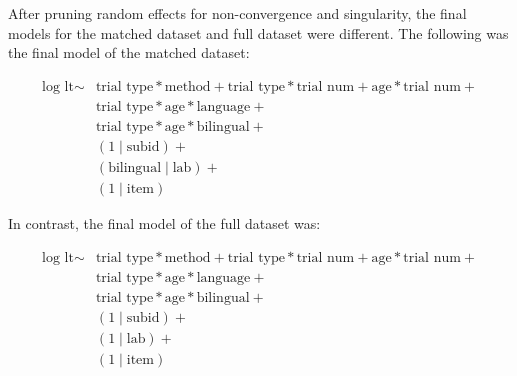 \documentclass[,man,floatsintext]{apa6}
\begin{document}
After pruning random effects for non-convergence and singularity, the final models for the matched dataset and full dataset were different. The following was the final model of the matched dataset:

\begin{equation}
\begin{split}
\text{log lt} \sim & \text{trial type} * \text{method} + \text{trial type} * \text{trial num} + \text{age} * \text{trial num} + \\
& \text{trial type} * \text{age} * \text{language} + \\
& \text{trial type} * \text{age} * \text{bilingual} + \\
& (1 \mid \text{subid}) + \\
& (\text{bilingual} \mid \text{lab}) + \\
& (1 \mid \text{item})
\end{split}
\end{equation}

In contrast, the final model of the full dataset was:

\begin{equation}
\begin{split}
\text{log lt} \sim & \text{trial type} * \text{method} + \text{trial type} * \text{trial num} + \text{age} * \text{trial num} + \\
& \text{trial type} * \text{age} * \text{language} + \\
& \text{trial type} * \text{age} * \text{bilingual} + \\
& (1 \mid \text{subid}) + \\
& (1 \mid \text{lab}) + \\
& (1 \mid \text{item})
\end{split}
\end{equation}
\end{document}
